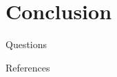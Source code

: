 \documentclass{beamer}
\begin{document}
\section{Conclusion}

\begin{frame}
    \begin{center}
        \huge
        Questions
    \end{center}
\end{frame}


\appendix

\begin{frame}[allowframebreaks]{References}
    
    
\end{frame}

\end{document}
